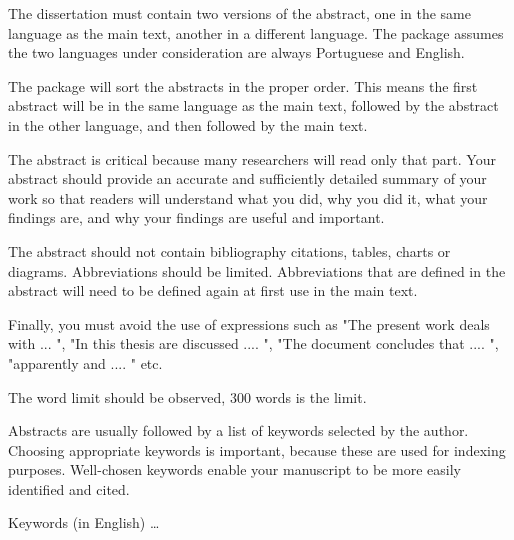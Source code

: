 \abstractEN %

The dissertation must contain two versions of the abstract, one in the same language as the main text, another in a different language.  The package assumes the two languages under consideration are always Portuguese and English.

The package will sort the abstracts in the proper order. This means the first abstract will be in the same language as the main text, followed by the abstract in the other language, and then followed by the main text. 

The abstract is critical because many researchers will read only that part. Your abstract should provide an accurate and sufficiently detailed summary of your work so that readers will understand what you did, why you did it, what your findings are, and why your findings are useful and important. 

The abstract should not contain bibliography citations, tables, charts or diagrams.  Abbreviations should be limited. Abbreviations that are defined in the abstract will need to be defined again at first use in the main text. 

Finally, you must avoid the use of expressions such as "The present work deals with ... ", "In this thesis are discussed .... ", "The document concludes that .... ", "apparently and .... " etc.

The word limit should be observed, 300 words is the limit.

Abstracts are usually followed by a list of keywords selected by the author. Choosing appropriate keywords is important, because these are used for indexing purposes. Well-chosen keywords enable your manuscript to be more easily identified and cited. 

\begin{keywords}
Keywords (in English) \ldots
\end{keywords} 
